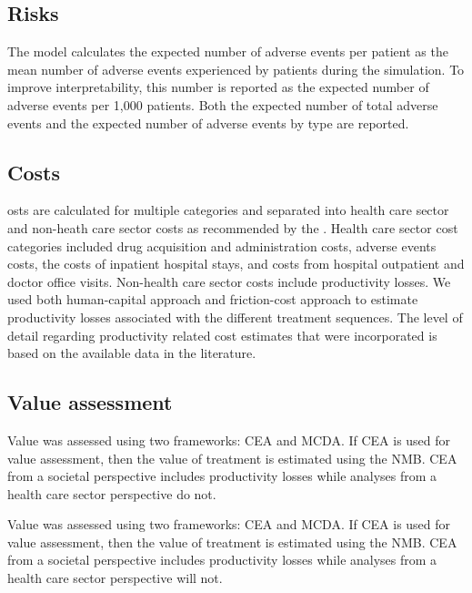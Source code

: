 \documentclass[11pt,final,fleqn]{article}\usepackage[]{graphicx}\usepackage[]{color}
\theoremstyle{plain}
\begin{document}
{\subsection{Risks}

The model calculates the expected number of adverse events per patient as the mean number of adverse events experienced by patients during the simulation. To improve interpretability, this number is reported as the expected number of adverse events per 1,000 patients. Both the expected number of total adverse events and the expected number of adverse events by type are reported.

\subsection{Costs} 

osts are calculated for multiple categories and separated into health care sector and non-heath care sector costs as recommended by the \citet{sanders2016recommendations}. Health care sector cost categories included drug acquisition and administration costs, adverse events costs, the costs of inpatient hospital stays, and costs from hospital outpatient and doctor office visits. Non-health care sector costs include productivity losses. We used both human-capital approach and friction-cost approach to estimate productivity losses associated with the different treatment sequences. The level of detail regarding productivity related cost estimates that were incorporated is based on the available data in the literature.

\subsection{Value assessment} 

Value was assessed using two frameworks: CEA and MCDA. If CEA is used for value assessment, then the value of treatment is estimated using the NMB. CEA from a societal perspective includes productivity losses while analyses from a health care sector perspective do not.

Value was assessed using two frameworks: CEA and MCDA. If CEA is used for value assessment, then the value of treatment is estimated using the NMB. CEA from a societal perspective includes productivity losses while analyses from a health care sector perspective will not. 

}
\end{document}
